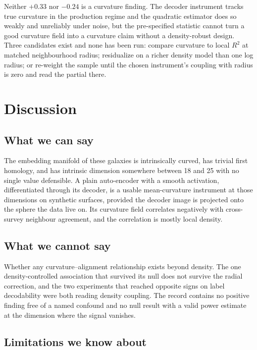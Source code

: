 \documentclass[11pt,a4paper]{article}
\begin{document}
Neither $+0.33$ nor $-0.24$ is a curvature finding. The decoder instrument tracks true curvature in the production regime and the quadratic estimator does so weakly and unreliably under noise, but the pre-specified statistic cannot turn a good curvature field into a curvature claim without a density-robust design. Three candidates exist and none has been run: compare curvature to local $R^2$ at matched neighbourhood radius; residualize on a richer density model than one log radius; or re-weight the sample until the chosen instrument's coupling with radius is zero and read the partial there.

\section{Discussion}

\subsection{What we can say}

The embedding manifold of these galaxies is intrinsically curved, has trivial first homology, and has intrinsic dimension somewhere between 18 and 25 with no single value defensible. A plain auto-encoder with a smooth activation, differentiated through its decoder, is a usable mean-curvature instrument at those dimensions on synthetic surfaces, provided the decoder image is projected onto the sphere the data live on. Its curvature field correlates negatively with cross-survey neighbour agreement, and the correlation is mostly local density.

\subsection{What we cannot say}

Whether any curvature--alignment relationship exists beyond density. The one density-controlled association that survived its null does not survive the radial correction, and the two experiments that reached opposite signs on label decodability were both reading density coupling. The record contains no positive finding free of a named confound and no null result with a valid power estimate at the dimension where the signal vanishes.

\subsection{Limitations we know about}
\end{document}
